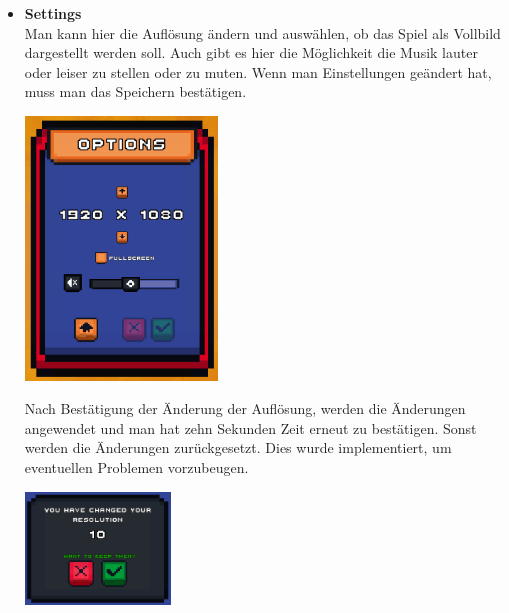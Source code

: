 \begin{itemize}
\begin {itemize}
        \item \textbf{Settings}\\
            Man kann hier die Auflösung ändern und auswählen, ob das Spiel als Vollbild dargestellt werden soll. Auch gibt es hier die Möglichkeit die Musik lauter oder leiser zu stellen
            oder zu muten. Wenn man Einstellungen geändert hat, muss man das Speichern bestätigen. 
            \begin{center}
                \includegraphics*[height=7cm]{resources/setting.png}\\
            \end{center}
            Nach Bestätigung der Änderung der Auflösung, werden die Änderungen angewendet und man hat zehn Sekunden Zeit erneut zu bestätigen. Sonst werden die Änderungen zurückgesetzt.
            Dies wurde implementiert, um eventuellen Problemen vorzubeugen. 
            \begin{center}
                \includegraphics*[height=3cm]{resources/resolution.png}\\
            \end{center}
            

\end{itemize}
\end{itemize}
